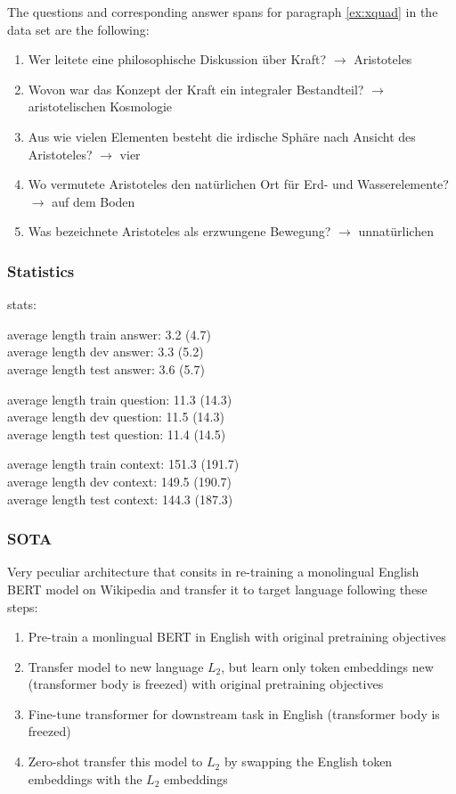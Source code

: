 The questions and corresponding answer spans for paragraph \ref{ex:xquad} in the data set are the following:

\begin{enumerate}
	\item Wer leitete eine philosophische Diskussion über Kraft? $\rightarrow$ Aristoteles
	\item Wovon war das Konzept der Kraft ein integraler Bestandteil? $\rightarrow$ aristotelischen Kosmologie
	\item Aus wie vielen Elementen besteht die irdische Sphäre nach Ansicht des Aristoteles? $\rightarrow$ vier
	\item Wo vermutete Aristoteles den natürlichen Ort für Erd- und Wasserelemente? $\rightarrow$ auf dem Boden
	\item Was bezeichnete Aristoteles als erzwungene Bewegung? $\rightarrow$ unnatürlichen
\end{enumerate}

\cite{artetxe2019cross}

\subsubsection{Statistics}
stats:

average length train answer: 3.2 (4.7) \\
average length dev answer:  3.3 (5.2) \\
average length test answer: 3.6 (5.7)

average length train question: 11.3 (14.3)  \\
average length dev question: 11.5 (14.3)  \\
average length test question: 11.4 (14.5)

average length train context: 151.3 (191.7)  \\
average length dev context: 149.5 (190.7) \\
average length test context: 144.3 (187.3)

\subsubsection{SOTA}

Very peculiar architecture that consits in re-training a monolingual English BERT model on Wikipedia and transfer it to target language following these steps:

\begin{enumerate}
    \item Pre-train a monlingual BERT in English with original pretraining objectives
    \item Transfer model to new language $L_2$, but learn only token embeddings new (transformer body is freezed) with original pretraining objectives
    \item Fine-tune transformer for downstream task in English (transformer body is freezed)
    \item Zero-shot transfer this model to $L_2$ by swapping the English token embeddings with the $L_2$ embeddings
\end{enumerate}

